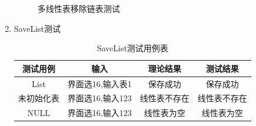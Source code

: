 \documentclass[supercite]{HustGraduPaper}
\theoremstyle{definition}
\begin{document}
\begin{enumerate}
\begin{figure}[htb]
		      \caption{多线性表移除链表测试}
	      \end{figure}
	      \newpage
	\item SaveList测试
	      \begin{table}[htb]
		      \begin{center}
			      \setlength{\tabcolsep}{2.0mm}
			      \caption{SaveList测试用例表}
			      \label{table22}
			      \begin{tabular}{|c|c|c|c|}
				      \hline
				      测试用例   & 输入             & 理论结果     & 测试结果     \\
				      \hline
				      \hline
				      List       & 界面选16,输入表1 & 保存成功     & 保存成功     \\
				      \hline
				      未初始化表 & 界面选16,输入123 & 线性表不存在 & 线性表不存在 \\
				      \hline
				      NULL       & 界面选16,输入123 & 线性表为空   & 线性表为空   \\
				      \hline
			      \end{tabular}
		      \end{center}
	      \end{table}
	      \begin{figure}[htb]
		      \centering
		      \quad
		      \quad
		      \quad

\end{figure}
\end{enumerate}
\end{document}
